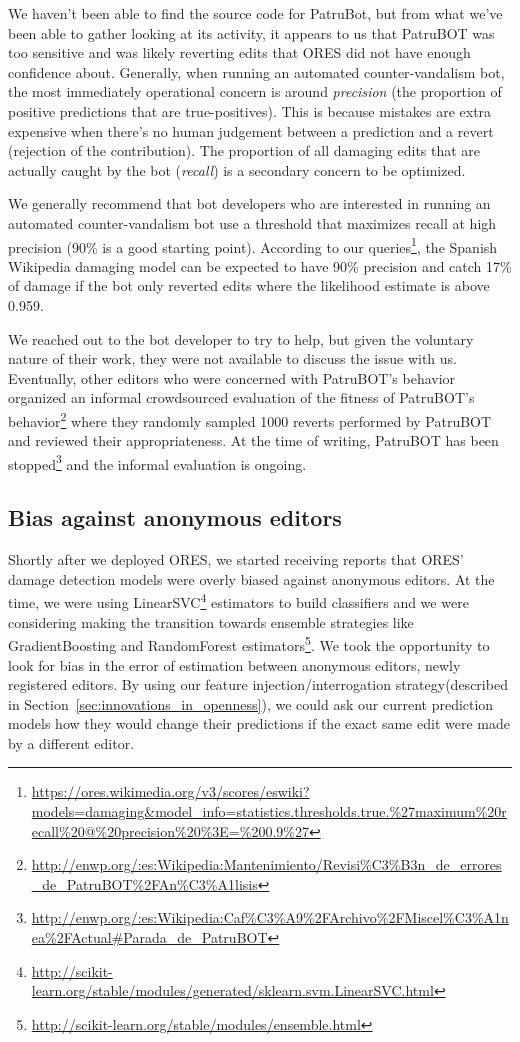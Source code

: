 We haven't been able to find the source code for PatruBot, but from what we've been able to gather looking at its activity, it appears to us that PatruBOT was too sensitive and was likely reverting edits that ORES did not have enough confidence about.  Generally, when running an automated counter-vandalism bot, the most immediately operational concern is around \emph{precision} (the proportion of positive predictions that are true-positives).  This is because mistakes are extra expensive when there's no human judgement between a prediction and a revert (rejection of the contribution).  The proportion of all damaging edits that are actually caught by the bot (\emph{recall}) is a secondary concern to be optimized.

We generally recommend that bot developers who are interested in running an automated counter-vandalism bot use a threshold that maximizes recall at high precision (90\% is a good starting point).  According to our queries\footnote{\url{https://ores.wikimedia.org/v3/scores/eswiki?models=damaging&model_info=statistics.thresholds.true.\%27maximum\%20recall\%20@\%20precision\%20\%3E=\%200.9\%27}}, the Spanish Wikipedia damaging model can be expected to have 90\% precision and catch 17\% of damage if the bot only reverted edits where the likelihood estimate is above 0.959.

We reached out to the bot developer to try to help, but given the voluntary nature of their work, they were not available to discuss the issue with us.  Eventually, other editors who were concerned with PatruBOT's behavior organized an informal crowdsourced evaluation of the fitness of PatruBOT's behavior\footnote{\url{http://enwp.org/:es:Wikipedia:Mantenimiento/Revisi\%C3\%B3n_de_errores_de_PatruBOT\%2FAn\%C3\%A1lisis}} where they randomly sampled 1000 reverts performed by PatruBOT and reviewed their appropriateness. At the time of writing, PatruBOT has been stopped\footnote{\url{http://enwp.org/:es:Wikipedia:Caf\%C3\%A9\%2FArchivo\%2FMiscel\%C3\%A1nea\%2FActual\#Parada_de_PatruBOT}} and the informal evaluation is ongoing.

\subsection{Bias against anonymous editors}
Shortly after we deployed ORES, we started receiving reports that ORES' damage detection models were overly biased against anonymous editors.  At the time, we were using LinearSVC\footnote{\url{http://scikit-learn.org/stable/modules/generated/sklearn.svm.LinearSVC.html}} estimators to build classifiers and we were considering making the transition towards ensemble strategies like GradientBoosting and RandomForest estimators\footnote{\url{http://scikit-learn.org/stable/modules/ensemble.html}}.  We took the opportunity to look for bias in the error of estimation between anonymous editors, newly registered editors.  By using our feature injection/interrogation strategy(described in Section~\ref{sec:innovations_in_openness}), we could ask our current prediction models how they would change their predictions if the exact same edit were made by a different editor.

